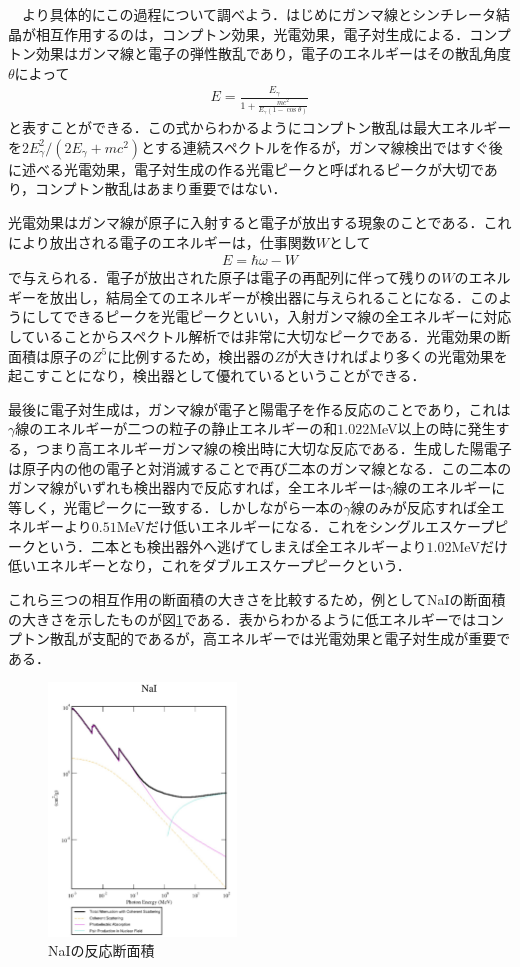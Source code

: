 \documentclass[a4j]{jarticle}
\begin{document}
　より具体的にこの過程について調べよう．はじめにガンマ線とシンチレータ結晶が相互作用するのは，コンプトン効果，光電効果，電子対生成による．コンプトン効果はガンマ線と電子の弾性散乱であり，電子のエネルギーはその散乱角度$\theta$によって
\begin{align*}
 E=\frac{E_\gamma}{1+\frac{mc^2}{E_\gamma(1-\cos\theta)}}
\end{align*}
と表すことができる．この式からわかるようにコンプトン散乱は最大エネルギーを$2E_\gamma^2/(2E_\gamma +mc^2)$とする連続スペクトルを作るが，ガンマ線検出ではすぐ後に述べる光電効果，電子対生成の作る光電ピークと呼ばれるピークが大切であり，コンプトン散乱はあまり重要ではない．

光電効果はガンマ線が原子に入射すると電子が放出する現象のことである．これにより放出される電子のエネルギーは，仕事関数$W$として
\begin{align*}
 E=\hbar\omega -W
\end{align*}
で与えられる．電子が放出された原子は電子の再配列に伴って残りの$W$のエネルギーを放出し，結局全てのエネルギーが検出器に与えられることになる．このようにしてできるピークを光電ピークといい，入射ガンマ線の全エネルギーに対応していることからスペクトル解析では非常に大切なピークである．光電効果の断面積は原子の$Z^5$に比例するため，検出器の$Z$が大きければより多くの光電効果を起こすことになり，検出器として優れているということができる．

最後に電子対生成は，ガンマ線が電子と陽電子を作る反応のことであり，これは$\gamma$線のエネルギーが二つの粒子の静止エネルギーの和$1.022$MeV以上の時に発生する，つまり高エネルギーガンマ線の検出時に大切な反応である．生成した陽電子は原子内の他の電子と対消滅することで再び二本のガンマ線となる．この二本のガンマ線がいずれも検出器内で反応すれば，全エネルギーは$\gamma$線のエネルギーに等しく，光電ピークに一致する．しかしながら一本の$\gamma$線のみが反応すれば全エネルギーより$0.51$MeVだけ低いエネルギーになる．これをシングルエスケープピークという．二本とも検出器外へ逃げてしまえば全エネルギーより$1.02$MeVだけ低いエネルギーとなり，これをダブルエスケープピークという．

これら三つの相互作用の断面積の大きさを比較するため，例としてNaIの断面積の大きさを示したものが図\ref{032623_3Sep18}である．表からわかるように低エネルギーではコンプトン散乱が支配的であるが，高エネルギーでは光電効果と電子対生成が重要である．
 \begin{figure}[htb]
  \centering
  \includegraphics[bb=0 0 1155 1554,width=5cm]{NaI.jpg}
  \caption{NaIの反応断面積}
  \label{032623_3Sep18}
 \end{figure}
\end{document}
